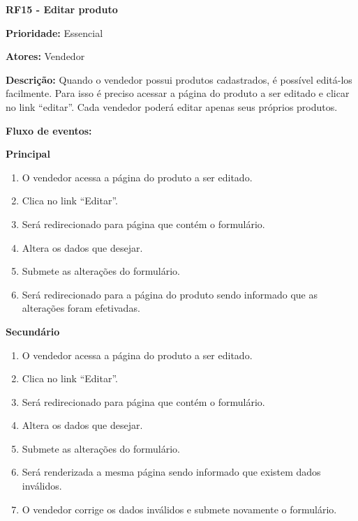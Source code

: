 \begin{apendicesenv}
\textbf{RF15 - Editar produto} \par
\textbf{Prioridade:} Essencial \par
\textbf{Atores:} Vendedor \par
\textbf{Descrição:} Quando o vendedor possui produtos cadastrados, é possível editá-los facilmente. Para isso é preciso acessar a página do produto a ser editado e clicar no link “editar”. Cada vendedor poderá editar apenas seus próprios produtos. \par
\textbf{Fluxo de eventos:} \par
\textbf{Principal} \par
\begin{enumerate}
  \item O vendedor acessa a página do produto a ser editado.
  \item Clica no link “Editar”.
  \item Será redirecionado para página que contém o formulário.
  \item Altera os dados que desejar.
  \item Submete as alterações do formulário.
  \item Será redirecionado para a página do produto sendo informado que as alterações foram efetivadas.
\end{enumerate} \par
\textbf{Secundário} \par
\begin{enumerate}
  \item O vendedor acessa a página do produto a ser editado.
  \item Clica no link “Editar”.
  \item Será redirecionado para página que contém o formulário.
  \item Altera os dados que desejar.
  \item Submete as alterações do formulário.
  \item Será renderizada a mesma página sendo informado que existem dados inválidos.
  \item O vendedor corrige os dados inválidos e submete novamente o formulário.
\end{enumerate}


\end{apendicesenv}
